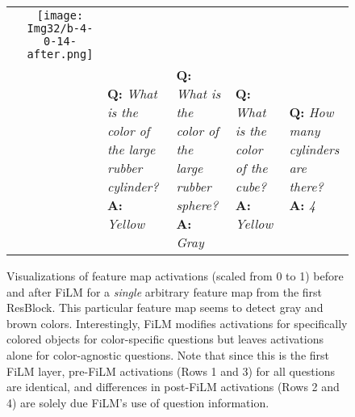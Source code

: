 \documentclass[letterpaper]{article} \usepackage{aaai18}  \usepackage{times}  \usepackage{helvet}  \usepackage{courier}  \usepackage{url}  \usepackage{graphicx}  \frenchspacing  \setlength{\pdfpagewidth}{8.5in}  \setlength{\pdfpageheight}{11in}
\begin{document}
\begin{figure*}[th]
{\begin{tabular}{ccm{2.85cm}m{2.85cm}m{2.85cm}m{2.85cm}}
         &
         \texttt{[image: Img32/b-4-0-14-after.png]}
         \\
         &
         &
         \textbf{Q:} \textit{What is the color of the large rubber cylinder?} \textbf{A:} \textit{Yellow}
         & 
         \textbf{Q:} \textit{What is the color of the large rubber sphere?} \textbf{A:} \textit{Gray}
         & 
   	 	\textbf{Q:} \textit{What is the color of the cube?} \textbf{A:} \textit{Yellow}
         &
         \textbf{Q:} \textit{How many cylinders are there?}  \textbf{A:} \textit{4}        
 	\end{tabular}
    }
      \caption{Visualizations of feature map activations (scaled from 0 to 1) before and after FiLM for a \textit{single} arbitrary feature map from the first ResBlock. This particular feature map seems to detect gray and brown colors. Interestingly, FiLM modifies activations for specifically colored objects for color-specific questions but leaves activations alone for color-agnostic questions. Note that since this is the first FiLM layer, pre-FiLM activations (Rows 1 and 3) for all questions are identical, and differences in post-FiLM activations (Rows 2 and 4) are solely due FiLM's use of question information.}
      \label{fig:film-effect-1}
\end{figure*}
  
\end{document}
